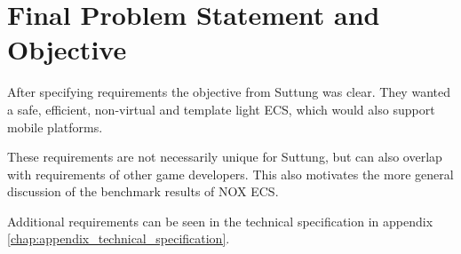 \section{Final Problem Statement and Objective}
After specifying requirements the objective from Suttung was clear.
They wanted a safe, efficient, non-virtual and template light ECS,
which would also support mobile platforms.

These requirements are not necessarily unique for Suttung,
but can also overlap with requirements of other game developers.
This also motivates the more general discussion of the benchmark results of NOX ECS.

Additional requirements can be seen in the technical specification in appendix \ref{chap:appendix_technical_specification}.

